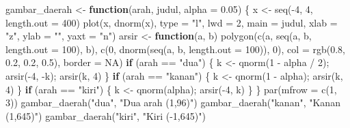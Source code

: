 \documentclass[
  indonesian,
  letterpaper,
]{book}
\newenvironment{Shaded}{\begin{snugshade}}{\end{snugshade}}
\newcommand{\AttributeTok}[1]{\textcolor[rgb]{0.40,0.45,0.13}{#1}}
\newcommand{\ConstantTok}[1]{\textcolor[rgb]{0.56,0.35,0.01}{#1}}
\newcommand{\ControlFlowTok}[1]{\textcolor[rgb]{0.00,0.23,0.31}{\textbf{#1}}}
\newcommand{\DecValTok}[1]{\textcolor[rgb]{0.68,0.00,0.00}{#1}}
\newcommand{\FloatTok}[1]{\textcolor[rgb]{0.68,0.00,0.00}{#1}}
\newcommand{\FunctionTok}[1]{\textcolor[rgb]{0.28,0.35,0.67}{#1}}
\newcommand{\NormalTok}[1]{\textcolor[rgb]{0.00,0.23,0.31}{#1}}
\newcommand{\OtherTok}[1]{\textcolor[rgb]{0.00,0.23,0.31}{#1}}
\newcommand{\SpecialCharTok}[1]{\textcolor[rgb]{0.37,0.37,0.37}{#1}}
\newcommand{\StringTok}[1]{\textcolor[rgb]{0.13,0.47,0.30}{#1}}
\begin{document}
\begin{Shaded}
\begin{Highlighting}[]
\NormalTok{gambar\_daerah }\OtherTok{\textless{}{-}} \ControlFlowTok{function}\NormalTok{(arah, judul, }\AttributeTok{alpha =} \FloatTok{0.05}\NormalTok{) \{}
\NormalTok{  x }\OtherTok{\textless{}{-}} \FunctionTok{seq}\NormalTok{(}\SpecialCharTok{{-}}\DecValTok{4}\NormalTok{, }\DecValTok{4}\NormalTok{, }\AttributeTok{length.out =} \DecValTok{400}\NormalTok{)}
  \FunctionTok{plot}\NormalTok{(x, }\FunctionTok{dnorm}\NormalTok{(x), }\AttributeTok{type =} \StringTok{"l"}\NormalTok{, }\AttributeTok{lwd =} \DecValTok{2}\NormalTok{, }\AttributeTok{main =}\NormalTok{ judul, }\AttributeTok{xlab =} \StringTok{"z"}\NormalTok{, }\AttributeTok{ylab =} \StringTok{""}\NormalTok{, }\AttributeTok{yaxt =} \StringTok{"n"}\NormalTok{)}
\NormalTok{  arsir }\OtherTok{\textless{}{-}} \ControlFlowTok{function}\NormalTok{(a, b) }\FunctionTok{polygon}\NormalTok{(}\FunctionTok{c}\NormalTok{(a, }\FunctionTok{seq}\NormalTok{(a, b, }\AttributeTok{length.out =} \DecValTok{100}\NormalTok{), b),}
                                  \FunctionTok{c}\NormalTok{(}\DecValTok{0}\NormalTok{, }\FunctionTok{dnorm}\NormalTok{(}\FunctionTok{seq}\NormalTok{(a, b, }\AttributeTok{length.out =} \DecValTok{100}\NormalTok{)), }\DecValTok{0}\NormalTok{),}
                                  \AttributeTok{col =} \FunctionTok{rgb}\NormalTok{(}\FloatTok{0.8}\NormalTok{, }\FloatTok{0.2}\NormalTok{, }\FloatTok{0.2}\NormalTok{, }\FloatTok{0.5}\NormalTok{), }\AttributeTok{border =} \ConstantTok{NA}\NormalTok{)}
  \ControlFlowTok{if}\NormalTok{ (arah }\SpecialCharTok{==} \StringTok{"dua"}\NormalTok{)   \{ k }\OtherTok{\textless{}{-}} \FunctionTok{qnorm}\NormalTok{(}\DecValTok{1} \SpecialCharTok{{-}}\NormalTok{ alpha }\SpecialCharTok{/} \DecValTok{2}\NormalTok{); }\FunctionTok{arsir}\NormalTok{(}\SpecialCharTok{{-}}\DecValTok{4}\NormalTok{, }\SpecialCharTok{{-}}\NormalTok{k); }\FunctionTok{arsir}\NormalTok{(k, }\DecValTok{4}\NormalTok{) \}}
  \ControlFlowTok{if}\NormalTok{ (arah }\SpecialCharTok{==} \StringTok{"kanan"}\NormalTok{) \{ k }\OtherTok{\textless{}{-}} \FunctionTok{qnorm}\NormalTok{(}\DecValTok{1} \SpecialCharTok{{-}}\NormalTok{ alpha); }\FunctionTok{arsir}\NormalTok{(k, }\DecValTok{4}\NormalTok{) \}}
  \ControlFlowTok{if}\NormalTok{ (arah }\SpecialCharTok{==} \StringTok{"kiri"}\NormalTok{)  \{ k }\OtherTok{\textless{}{-}} \FunctionTok{qnorm}\NormalTok{(alpha); }\FunctionTok{arsir}\NormalTok{(}\SpecialCharTok{{-}}\DecValTok{4}\NormalTok{, k) \}}
\NormalTok{\}}
\FunctionTok{par}\NormalTok{(}\AttributeTok{mfrow =} \FunctionTok{c}\NormalTok{(}\DecValTok{1}\NormalTok{, }\DecValTok{3}\NormalTok{))}
\FunctionTok{gambar\_daerah}\NormalTok{(}\StringTok{"dua"}\NormalTok{, }\StringTok{"Dua arah (1,96)"}\NormalTok{)}
\FunctionTok{gambar\_daerah}\NormalTok{(}\StringTok{"kanan"}\NormalTok{, }\StringTok{"Kanan (1,645)"}\NormalTok{)}
\FunctionTok{gambar\_daerah}\NormalTok{(}\StringTok{"kiri"}\NormalTok{, }\StringTok{"Kiri ({-}1,645)"}\NormalTok{)}
\end{Highlighting}
\end{Shaded}
\end{document}
